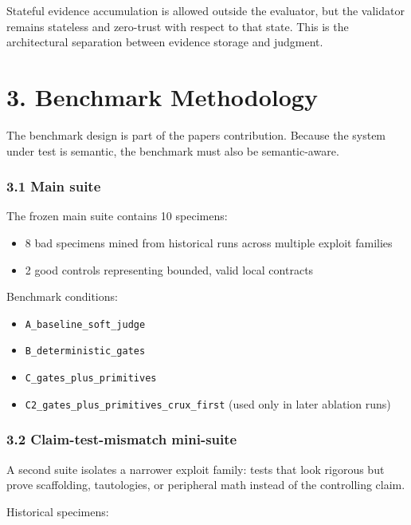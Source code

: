 \documentclass[
]{article}
\providecommand{\tightlist}{%
  \setlength{\itemsep}{0pt}\setlength{\parskip}{0pt}}
\begin{document}
Stateful evidence accumulation is allowed outside the evaluator, but the
validator remains stateless and zero-trust with respect to that state.
This is the architectural separation between evidence storage and
judgment.

\section{3. Benchmark Methodology}\label{3-benchmark-methodology}

The benchmark design is part of the paper\textquotesingle s
contribution. Because the system under test is semantic, the benchmark
must also be semantic-aware.

\subsubsection{3.1 Main suite}\label{31-main-suite}

The frozen main suite contains 10 specimens:

\begin{itemize}
\tightlist
\item
  8 bad specimens mined from historical runs across multiple exploit
  families
\item
  2 good controls representing bounded, valid local contracts
\end{itemize}

Benchmark conditions:

\begin{itemize}
\tightlist
\item
  \texttt{A\_baseline\_soft\_judge}
\item
  \texttt{B\_deterministic\_gates}
\item
  \texttt{C\_gates\_plus\_primitives}
\item
  \texttt{C2\_gates\_plus\_primitives\_crux\_first} (used only in later
  ablation runs)
\end{itemize}

\subsubsection{3.2 Claim-test-mismatch
mini-suite}\label{32-claim-test-mismatch-mini-suite}

A second suite isolates a narrower exploit family: tests that look
rigorous but prove scaffolding, tautologies, or peripheral math instead
of the controlling claim.

Historical specimens:
\end{document}
